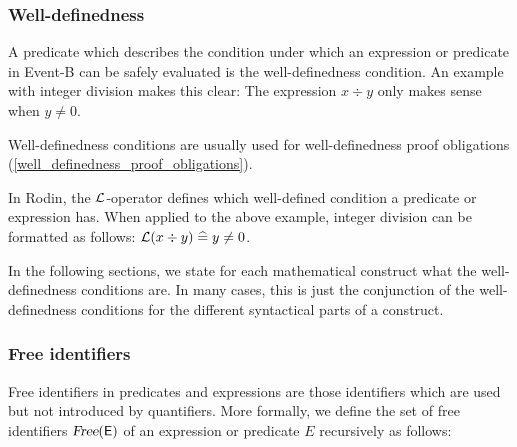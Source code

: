 \subsubsection{Well-definedness}
\label{well_definedness}

A predicate which describes the condition under which an expression or predicate in Event-B can be safely evaluated is the well-definedness condition.
An example with integer division makes this clear: The expression $x\div y$ only makes sense when $y\neq 0$.

Well-definedness conditions are usually used for well-definedness proof obligations (\ref{well_definedness_proof_obligations}).

In Rodin, the $\mathcal{L}$-operator defines which well-defined condition a predicate or expression has.
When applied to the above example, integer division can be formatted as follows: $\mathcal{L}(x\div y) \mathrel{\widehat=} y\neq 0$.

In the following sections, we state for each mathematical construct what the well-definedness conditions are.
In many cases, this is just the conjunction of the well-definedness conditions for the different syntactical parts of a construct.


\subsubsection{Free identifiers}
\label{free_identifiers}
Free identifiers in predicates and expressions are those identifiers which are used but not introduced by quantifiers.
More formally, we define the set of free identifiers $\textsl{Free}(\textsf{E})$ of an expression or predicate $E$ recursively as follows:

